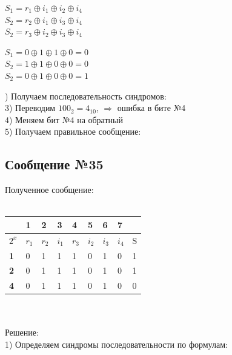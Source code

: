 \documentclass[12pt]{article}
\begin{document}
\begin{multicols}{2}

    \centering

    $S_1 = r_1 \oplus i_1 \oplus i_2 \oplus i_4$\\
    $S_2 = r_2 \oplus i_1 \oplus i_3 \oplus i_4$\\
    $S_2 = r_3 \oplus i_2 \oplus i_3 \oplus i_4$\\
    
    \columnbreak

    $S_1 = 0 \oplus 1 \oplus 1 \oplus 0 = 0$\\
    $S_2 = 1 \oplus 1 \oplus 0 \oplus 0 = 0$\\
    $S_2 = 0 \oplus 1 \oplus 0 \oplus 0 = 1$\\

\end{multicols}

) Получаем последовательность синдромов: \\
3) Переводим $100_2 = 4_{10}$, $\Rightarrow$ ошибка в бите №4\\
4) Меняем бит №4 на обратный\\
5) Получаем правильное сообщение: 

\newpage

\subsection{Сообщение №35}

Полученное сообщение: \\
\\
\begin{tabular}{
|p{1cm}|p{1cm}|p{1cm}|p{1cm}|p{1cm}|p{1cm}|p{1cm}|p{1cm}|p{1cm}|}
    \hline
     & 1 & 2 & 3 & 4 & 5 & 6 & 7 & \\
    \hline
    $2^x$ & $r_1$ & $r_2$ & $i_1$ & $r_3$ & $i_2$ & $i_3$ & $i_4$ & S\\
    \hline
    \textbf{1} & \cellcolor{cobalt} 0 & 1 & \cellcolor{cobalt} 1 & 1 & \cellcolor{cobalt} 0 & 1 & \cellcolor{cobalt} 0 & 1\\
    \hline
    \textbf{2} & 0 & \cellcolor{tacao} 1 & \cellcolor{tacao} 1 & 1 & 0 & \cellcolor{tacao} 1 & \cellcolor{tacao} 0 & 1\\
    \hline
    \textbf{4} & 0 & 1 & 1 & \cellcolor{feijoa} 1 & \cellcolor{feijoa} 0 & \cellcolor{feijoa} 1 & \cellcolor{feijoa} 0 & 0\\
    \hline
\end{tabular}
\\
\\
Решение:\\
1) Определяем синдромы последовательности по формулам:
\end{document}
